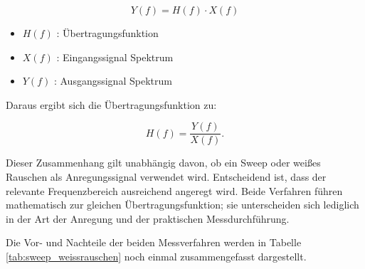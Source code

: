 \begin{equation}
Y(f) = H(f) \cdot X(f)
\end{equation}

\begin{itemize}
    \item $H(f)$ : Übertragungsfunktion
    \item $X(f)$ : Eingangssignal Spektrum
    \item $Y(f)$ : Ausgangssignal Spektrum
\end{itemize}

Daraus ergibt sich die Übertragungsfunktion zu:

\begin{equation}
H(f) = \frac{Y(f)}{X(f)}.
\end{equation}

Dieser Zusammenhang gilt unabhängig davon, ob ein Sweep oder weißes Rauschen als Anregungssignal verwendet wird. Entscheidend ist, dass der relevante Frequenzbereich ausreichend angeregt wird. Beide Verfahren führen mathematisch zur gleichen Übertragungsfunktion; sie unterscheiden sich lediglich in der Art der Anregung und der praktischen Messdurchführung.

Die Vor- und Nachteile der beiden Messverfahren werden in Tabelle \ref{tab:sweep_weissrauschen} noch einmal zusammengefasst dargestellt. \\

